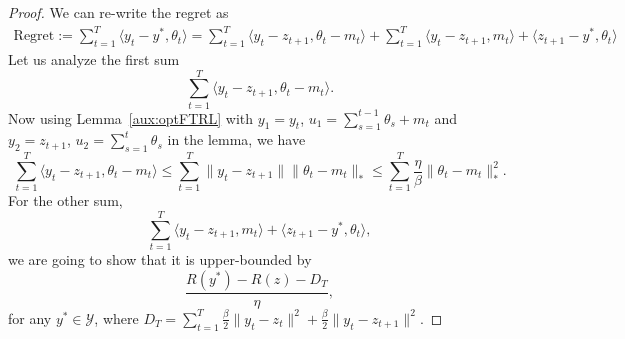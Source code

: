 \documentclass[final,12pt]{colt2018} %
\newcommand{\YY}{\mathcal{Y}}
\begin{document}
\begin{proof}
We can re-write the regret as
\begin{equation}
\begin{aligned}
\text{Regret}:= \sum_{t=1}^{T} \langle y_t - y^{*}, \theta_{t} \rangle
= \sum_{t=1}^{T} \langle y_t - z_{t+1} , \theta_t - m_t \rangle + 
 \sum_{t=1}^{T}  \langle y_t - z_{t+1} , m_t \rangle + \langle z_{t+1} - y^*, \theta_t \rangle 
\end{aligned}
\end{equation}
Let us analyze the first sum
\begin{equation}
\sum_{t=1}^{T} \langle y_t - z_{t+1} , \theta_t - m_t \rangle.
\end{equation}
Now using Lemma~\ref{aux:optFTRL}
with $y_{1}=y_{t}$, $u_{1}=\sum_{{s=1}}^{{t-1}} \theta_{s} + m_{t}$ and $y_{2}=z_{t+1}$, 
$u_{2}=\sum_{{s=1}}^{{t}} \theta_{s} $ in the lemma,
we have 
\begin{equation} \label{qq1}
\sum_{t=1}^{T} \langle y_t - z_{t+1} , \theta_t - m_t \rangle
\leq \sum_{t=1}^{T} \|  y_t - z_{t+1} \| \| \theta_t - m_t\|_* 
\leq 
\sum_{t=1}^{T} \frac{\eta}{\beta} \| \theta_t - m_t \|^2_*.
\end{equation}
For the other sum,
\begin{equation}
\sum_{t=1}^{T}  \langle y_t - z_{t+1} , m_t \rangle + \langle z_{t+1} - y^*, \theta_t \rangle,
\end{equation}
we are going to show that it is upper-bounded by
\begin{equation}
\frac{ R(y^*) - R(z) - D_T }{\eta}, 
\end{equation}
for any $y^* \in \YY$, where $D_{T} = \sum_{{t=1}}^{T} \frac{\beta}{2} \| y_t - z_{t} \|^2 
+ \frac{\beta}{2} \| y_t - z_{t+1} \|^2$.




\end{proof}
\end{document}

